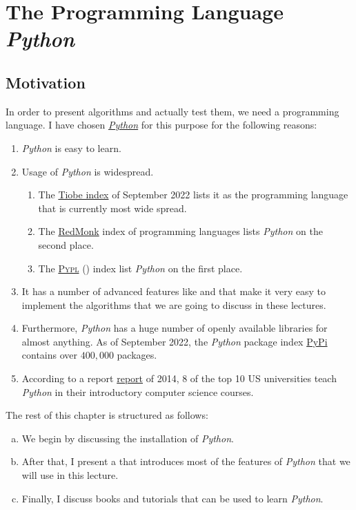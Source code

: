 \chapter{The Programming Language \textsl{Python}}
\section{Motivation}
In order to present algorithms and actually test them, we need a programming language.  I have chosen
\href{http://www.python.org}{\textsl{Python}} for this purpose for the following reasons:
\begin{enumerate}
\item \textsl{Python} is easy to learn.
\item Usage of \textsl{Python} is widespread.
  \begin{enumerate}
  \item The \href{https://www.tiobe.com/tiobe-index/}{Tiobe index}
        of September 2022 lists it as the programming language that is currently most wide spread.
  \item The \href{https://redmonk.com/sogrady/2022/03/28/language-rankings-1-22/}{RedMonk} index of programming
        languages lists \textsl{Python} on the second place.
  \item The \href{https://pypl.github.io/PYPL.html}{\textsc{Pypl}} ()
        index list \textsl{Python} on the first place.
  \end{enumerate}
\item It has a number of advanced features like  and  that make it very easy to
      implement the algorithms that we are going to discuss in these lectures.
\item Furthermore, \textsl{Python} has a huge number of openly available libraries for almost anything.
      As of September 2022, the \textsl{Python} package index \href{https://pypi.org}{PyPi} contains over
      $400,000$ packages.
\item According to a report
      \href{https://cacm.acm.org/blogs/blog-cacm/176450-python-is-now-the-most-popular-introductory-teaching-language-at-top-u-s-universities/fulltext}{report} 
      of 2014, 8 of the top 10 US universities teach \textsl{Python} in their introductory computer science courses.
\end{enumerate}
The rest of this chapter is structured as follows:
\begin{enumerate}[(a)]
\item We begin by discussing the installation of \textsl{Python}.
\item After that, I present a \textsl{} that introduces most of the features of
      \textsl{Python} that we will use in this lecture.
\item Finally, I discuss books and tutorials that can be used to learn \textsl{Python}.  
\end{enumerate}

